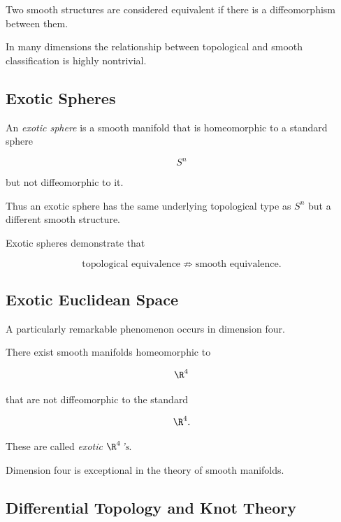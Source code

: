Two smooth structures are considered equivalent if there is a
diffeomorphism between them.

In many dimensions the relationship between topological and smooth
classification is highly nontrivial.

\subsection{Exotic Spheres}
\label{subsec:exotic-spheres}

An \emph{exotic sphere} is a smooth manifold that is homeomorphic to a
standard sphere

\[
S^n
\]

but not diffeomorphic to it.

Thus an exotic sphere has the same underlying topological type as \(S^n\)
but a different smooth structure.

Exotic spheres demonstrate that

\[
\boxed{
\text{topological equivalence}
\not\Rightarrow
\text{smooth equivalence}.
}
\]

\subsection{Exotic Euclidean Space}
\label{subsec:exotic-r4}

A particularly remarkable phenomenon occurs in dimension four.

There exist smooth manifolds homeomorphic to

\[
\R^4
\]

that are not diffeomorphic to the standard

\[
\R^4.
\]

These are called \emph{exotic \(\R^4\)'s}.

Dimension four is exceptional in the theory of smooth manifolds.

\subsection{Differential Topology and Knot Theory}
\label{subsec:differential-topology-knot-theory}

